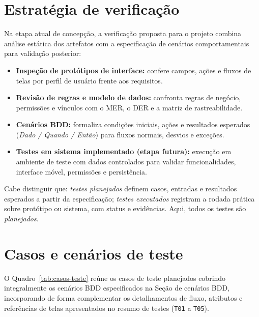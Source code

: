 \documentclass[a4paper,12pt]{report}
\begin{document}
\section{Estratégia de verificação}

Na etapa atual de concepção, a verificação proposta para o projeto combina análise estática dos artefatos com a especificação de cenários comportamentais para validação posterior:

\begin{itemize}
    \item \textbf{Inspeção de protótipos de interface:} confere campos, ações e fluxos de telas por perfil de usuário frente aos requisitos.
    \item \textbf{Revisão de regras e modelo de dados:} confronta regras de negócio, permissões e vínculos com o MER, o DER e a matriz de rastreabilidade.
    \item \textbf{Cenários BDD:} formaliza condições iniciais, ações e resultados esperados (\textit{Dado / Quando / Então}) para fluxos normais, desvios e exceções.
    \item \textbf{Testes em sistema implementado (etapa futura):} execução em ambiente de teste com dados controlados para validar funcionalidades, interface móvel, permissões e persistência.
\end{itemize}

Cabe distinguir que: \textit{testes planejados} definem casos, entradas e resultados esperados a partir da especificação; \textit{testes executados} registram a rodada prática sobre protótipo ou sistema, com status e evidências. Aqui, todos os testes são \textit{planejados}.

\section{Casos e cenários de teste}

O Quadro~\ref{tab:casos-teste} reúne os casos de teste planejados cobrindo integralmente os cenários BDD especificados na Seção de cenários BDD, incorporando de forma complementar os detalhamentos de fluxo, atributos e referências de telas apresentados no resumo de testes (\texttt{T01} a \texttt{T05}).
\end{document}
